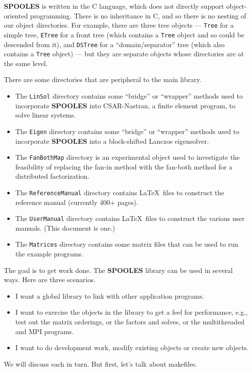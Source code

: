 {\bf SPOOLES} is written in the C language, which does not directly
support object-oriented programming.
There is no inheritance in C, and so there is no nesting of
our object directories.
For example, there are three tree objects ---
{\tt Tree} for a simple tree,
{\tt ETree} for a front tree (which contains a {\tt Tree} object
and so could be descended from it),
and
{\tt DSTree} for a ``domain/separator'' tree 
(which also contains a {\tt Tree} object) ---
but they are separate objects whose directories are at the same level.
\par
There are some directories that are peripheral to the main library.
\begin{itemize}
\item
The {\tt LinSol} directory contains some ``bridge'' or ``wrapper''
methods used to incorporate {\bf SPOOLES} into CSAR-Nastran, a
finite element program, to solve linear systems.
\item
The {\tt Eigen} directory contains some ``bridge'' or ``wrapper''
methods used to incorporate {\bf SPOOLES} into a block-shifted
Lanczos eigensolver.
\item
The {\tt FanBothMap} directory is an experimental object used to
investigate the feasibility of replacing the fan-in method with 
the fan-both method for a distributed factorization.
\item
The {\tt ReferenceManual} directory contains \LaTeX\ files to
construct the reference manual (currently 400+ pages).
\item
The {\tt UserManual} directory contains \LaTeX\ files to
construct the various user manuals. (This document is one.)
\item
The {\tt Matrices} directory contains some matrix files
that can be used to run the example programs.
\end{itemize}
\par
The goal is to get work done.
The {\bf SPOOLES} library can be used in several ways.
Here are three scenarios.
\begin{itemize}
\item
I want a global library to link with other application programs.
\item
I want to exercise the objects in the library to get a feel for
performance, e.g., test out the matrix orderings, or the factors
and solves, or the multithreaded and MPI programs.
\item
I want to do development work, modify existing objects or create
new objects.
\end{itemize}
We will discuss each in turn.
But first, let's talk about makefiles.
\par
